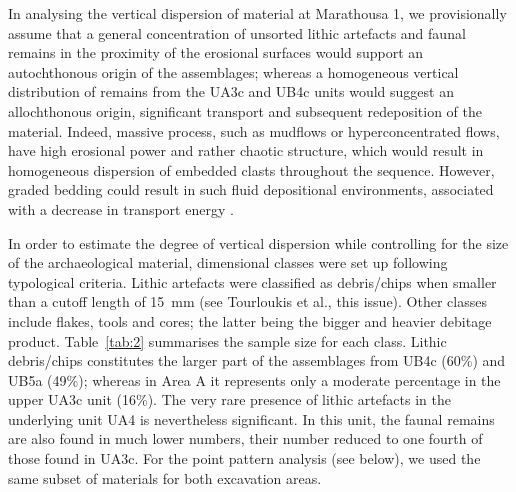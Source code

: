 \documentclass[preprint,authoryear,times]{elsarticle} %
\begin{document}
In analysing the vertical dispersion of material at Marathousa 1, we provisionally assume that a general concentration of unsorted lithic artefacts and faunal remains in the proximity of the erosional surfaces would support an autochthonous origin of the assemblages; whereas a homogeneous vertical distribution of remains from the UA3c and UB4c units would suggest an allochthonous origin, significant transport and subsequent redeposition of the material. Indeed, massive process, such as mudflows or hyperconcentrated flows, have high erosional power and rather chaotic structure, which would result in homogeneous dispersion of embedded clasts throughout the sequence. However, graded bedding could result in such fluid depositional environments, associated with a decrease in transport energy \citep{}.

In order to estimate the degree of vertical dispersion while controlling for the size of the archaeological material, dimensional classes were set up following typological criteria. Lithic artefacts were classified as debris/chips when smaller than a cutoff length of 15~mm (see Tourloukis et al., this issue). Other classes include flakes, tools and cores; the latter being the bigger and heavier debitage product. Table~\ref{tab:2} summarises the sample size for each class. Lithic debris/chips constitutes the larger part of the assemblages from UB4c (60\%) and UB5a (49\%); whereas in Area A it represents only a moderate percentage in the upper UA3c unit (16\%). The very rare presence of lithic artefacts in the underlying unit UA4 is nevertheless significant. In this unit, the faunal remains are also found in much lower numbers, their number reduced to one fourth of those found in UA3c. For the point pattern analysis (see below), we used the same subset of materials for both excavation areas.
\end{document}
